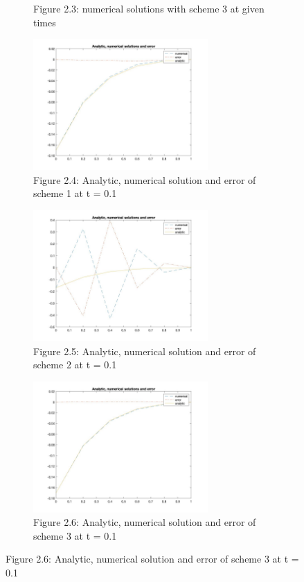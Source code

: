 \documentclass[a4paper,11pt]{article}
\begin{document}
\begin{enumerate}[label = (\roman*)]
\begin{figure}[H]
\begin{subfigure}{0.5\textwidth}
\caption{Figure 2.3: numerical solutions with scheme 3 at given times}
\label{Q2(3)}
\end{subfigure}
\begin{subfigure}{0.5\textwidth}
\includegraphics[width = \linewidth, height = 5cm]{Q2(4).jpg}
\caption{Figure 2.4: Analytic, numerical solution and error of scheme 1 at t = 0.1 }
\label{Q2(4)}
\end{subfigure}
\begin{subfigure}{0.5\textwidth}
\includegraphics[width = \linewidth, height = 5cm]{Q2(5).jpg}
\caption{Figure 2.5: Analytic, numerical solution and error of scheme 2 at t = 0.1}
\label{Q2(5)}
\end{subfigure}
\begin{subfigure}{0.5\textwidth}
\includegraphics[width = \linewidth, height = 5cm]{Q2(6).jpg}
\caption{Figure 2.6: Analytic, numerical solution and error of scheme 3 at t = 0.1}
\label{Q2(6)}
\end{subfigure}
\end{figure}
\begin{table}[H]

\end{table}
\end{enumerate}
\end{document}
